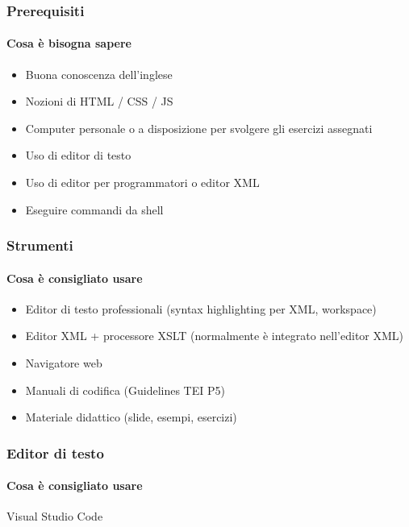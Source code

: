 



\begin{frame}
	\frametitle{Prerequisiti}
	\framesubtitle{Cosa è bisogna sapere}
	\addtocounter{nframe}{1}

	\begin{itemize}
		\item Buona conoscenza dell’inglese
		\item Nozioni di HTML / CSS / JS
		\item Computer personale o a disposizione per svolgere gli esercizi assegnati
		\item Uso di editor di testo
		\item Uso di editor per programmatori o editor XML
		\item Eseguire commandi da shell
	\end{itemize}

\end{frame}

\begin{frame}
	\frametitle{Strumenti}
	\framesubtitle{Cosa è consigliato usare}
	\addtocounter{nframe}{1}

	\begin{itemize}
		\item Editor di testo professionali (syntax highlighting per XML, workspace)
		\item Editor XML + processore XSLT (normalmente è integrato
		      nell’editor XML)
		\item Navigatore web
		\item Manuali di codifica (Guidelines TEI P5)
		\item Materiale didattico (slide, esempi, esercizi)
	\end{itemize}

\end{frame}

\begin{frame}
	\frametitle{Editor di testo}
	\framesubtitle{Cosa è consigliato usare}
	\addtocounter{nframe}{1}

	\begin{block}{Visual Studio Code}

	\end{block}

\end{frame}


